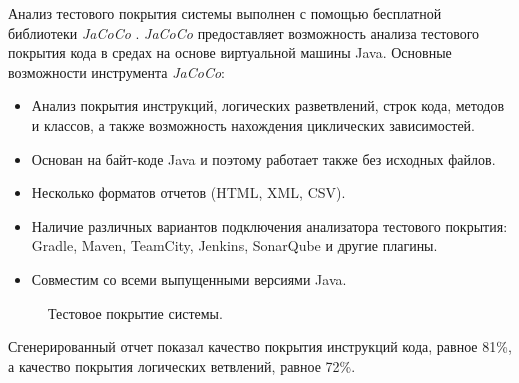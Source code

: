 \documentclass[a4paper,14pt]{extreport} %
\begin{document}
Анализ тестового покрытия системы выполнен с помощью бесплатной библиотеки \textit{JaCoCo} \cite{TEST_COVERAGE_LIB}. \textit{JaCoCo} предоставляет возможность анализа тестового покрытия кода в средах на основе виртуальной машины Java.
Основные возможности инструмента \textit{JaCoCo}:
\begin{itemize}
\item Анализ покрытия инструкций, логических разветвлений, строк кода, методов и классов, а также возможность нахождения циклических зависимостей.
\item Основан на байт-коде Java и поэтому работает также без исходных файлов.
\item Несколько форматов отчетов (HTML, XML, CSV).
\item Наличие различных вариантов подключения анализатора тестового покрытия: Gradle, Maven, TeamCity, Jenkins, SonarQube и другие  плагины.
\item Совместим со всеми выпущенными версиями Java.
\end{itemize}

\begin{figure}[H]
\caption{Тестовое покрытие системы.}
\label{test-coverage}
\end{figure}

Сгенерированный отчет показал качество покрытия инструкций кода, равное 81\%, а качество покрытия логических ветвлений, равное 72\%.
\end{document}

